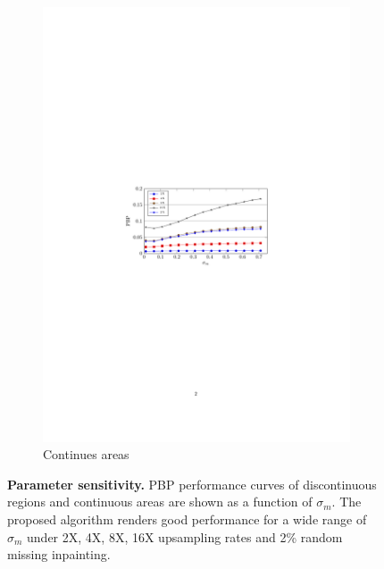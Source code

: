 \documentclass[preprint,10pt,5p,times,twocolumn]{elsarticle}
\begin{document}
\begin{figure}[t]
\begin{subfigure}[b]{0.35\linewidth}
    \includegraphics[width=\linewidth]{PBP2.pdf}
    \caption{Continues areas}
    \label{fig:} %
 \end{subfigure}%
\caption{\textbf{Parameter sensitivity.} PBP performance curves of discontinuous regions and continuous areas are shown as a function of $\sigma_m$. The proposed algorithm renders good performance for a wide range of $\sigma_m$ under 2X, 4X, 8X, 16X upsampling rates and 2\% random missing inpainting.}
\label{fig:sensitivity}
\end{figure}
\end{document}
